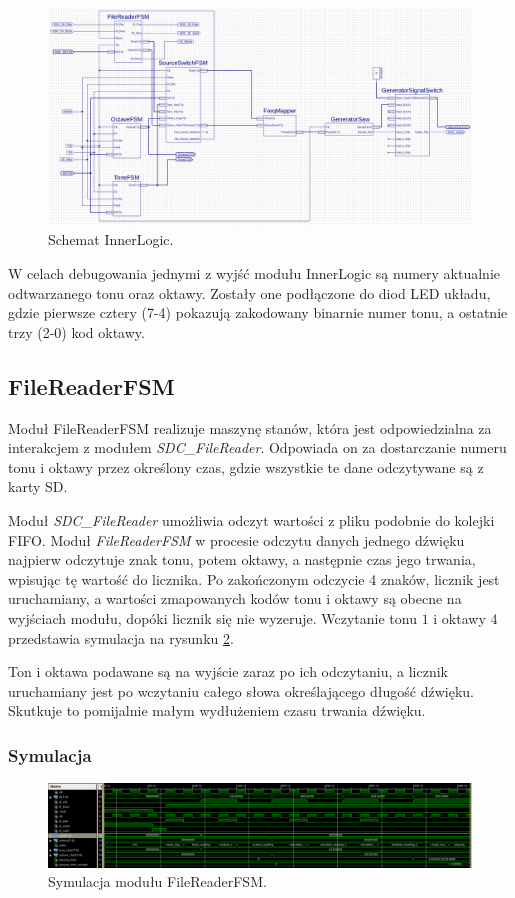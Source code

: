 \documentclass[a4paper,12pt]{article}
\begin{document}
\begin{figure}[H]
  \centering
  \includegraphics[width=\linewidth]{images/inner}
  \caption{Schemat InnerLogic.}
  \label{sch:inner}
\end{figure}

W celach debugowania jednymi z wyjść modułu InnerLogic są numery aktualnie odtwarzanego tonu oraz oktawy. Zostały one podłączone do diod LED układu, gdzie pierwsze cztery (7-4) pokazują zakodowany binarnie numer tonu, a ostatnie trzy (2-0) kod oktawy. 

\subsection{FileReaderFSM}

Moduł FileReaderFSM realizuje maszynę stanów, która jest odpowiedzialna za interakcjem z modułem \textit{SDC\_FileReader}. Odpowiada on za dostarczanie numeru tonu i oktawy przez określony czas, gdzie wszystkie te dane odczytywane są z karty SD.

Moduł \textit{SDC\_FileReader} umożliwia odczyt wartości z pliku podobnie do kolejki FIFO. Moduł \textit{FileReaderFSM} w procesie odczytu danych jednego dźwięku najpierw odczytuje znak tonu, potem oktawy, a następnie czas jego trwania, wpisując tę wartość do licznika. Po zakończonym odczycie 4 znaków, licznik jest uruchamiany, a wartości zmapowanych kodów tonu i oktawy są obecne na wyjściach modułu, dopóki licznik się nie wyzeruje. Wczytanie tonu $1$ i oktawy $4$ przedstawia symulacja na rysunku \ref{sim:fileReader}.

Ton i oktawa podawane są na wyjście zaraz po ich odczytaniu, a licznik uruchamiany jest po wczytaniu całego słowa określającego długość dźwięku. Skutkuje to pomijalnie małym wydłużeniem czasu trwania dźwięku.
\subsubsection{Symulacja}
\begin{figure}[H]
  \centering
  \includegraphics[decodearray={1 0 1 0 1 0}, width=\linewidth]{images/filereader}
  \caption{Symulacja modułu FileReaderFSM.}
  \label{sim:fileReader}
\end{figure}
\end{document}
